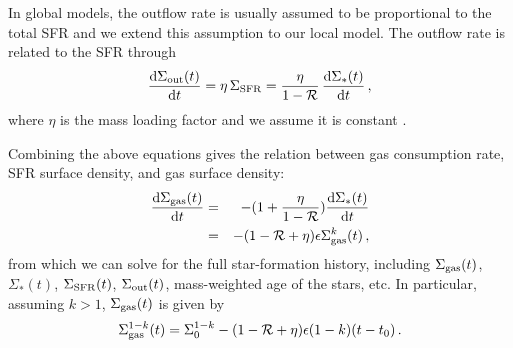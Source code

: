 \documentclass[12pt, appendixfloats, numberedappendix]{emulateapj}
\begin{document}
In global models, the outflow rate is usually assumed to be proportional to the total SFR \citep[\eg][]{springel03a, dallavecchia08a} 
and we extend this assumption to our local model.
The outflow rate is related to the SFR through
\begin{equation}
\frac{{\rm d} \Sigma_{\rm out}(t)}{{\rm d} t} = \eta\,\Sigma_{\rm SFR} = \frac{\eta}{1-\mathcal{R}}\,\frac{{\rm d} \Sigma_{\rm *}(t)}{{\rm d} t} \,\mathrm{,}
\label{eq:outflow}
\end{equation}
\noindent where $\eta$ is the mass loading factor and we assume it is constant \citep[\eg][]{springel03a, heckman15a}.

Combining the above equations gives the relation between gas consumption rate, SFR surface density, and gas surface density:
\begin{eqnarray}
\frac{{\rm d} \Sigma_{\rm gas}(t)}{{\rm d} t} & = & -(1+\frac{\eta}{1-\mathcal{R}}) \frac{{\rm d} \Sigma_{\rm *}(t)}{{\rm d} t} \\
 & = & -(1-\mathcal{R}+\eta) \epsilon \Sigma_{\rm gas}^k(t) \,\mathrm{,}
\end{eqnarray}
\noindent from which we can solve for the full star-formation history, 
including $\Sigma_{\rm gas}(t)$, $\Sigma_{*}(t)$, $\Sigma_{\rm SFR}(t)$, $\Sigma_{\rm out}(t)$, mass-weighted age of the stars, etc.
In particular, assuming $k>1$, $\Sigma_{\rm gas}(t)$ is given by
\begin{equation}
\Sigma_{\rm gas}^{1-k}(t) = \Sigma_0^{1-k} - (1-\mathcal{R}+\eta)\epsilon(1-k)(t-t_0)\,\mathrm{.}
\end{equation}
\end{document}
